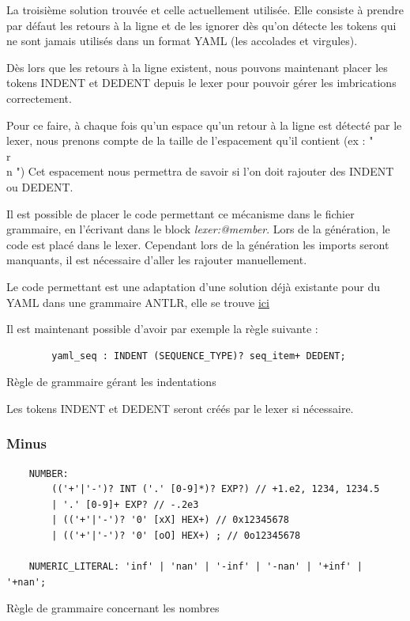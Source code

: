 \documentclass[
    iict, %
    il, %
]{heig-tb}
\begin{document}
La troisième solution trouvée et celle actuellement utilisée. Elle consiste à prendre par défaut les retours à la ligne et de les ignorer dès qu'on détecte les tokens
qui ne sont jamais utilisés dans un format YAML (les accolades et virgules).

Dès lors que les retours à la ligne existent, nous pouvons maintenant placer les tokens INDENT et DEDENT depuis le lexer
pour pouvoir gérer les imbrications correctement.

Pour ce faire, à chaque fois qu'un espace qu'un retour à la ligne est détecté par le lexer, nous prenons compte de la taille de l'espacement qu'il contient (ex : "\\r\\n    ")
Cet espacement nous permettra de savoir si l'on doit rajouter des INDENT ou DEDENT.

Il est possible de placer le code permettant ce mécanisme dans le fichier grammaire, en l'écrivant dans le block \emph{lexer:@member{}}.
Lors de la génération, le code est placé dans le lexer. Cependant lors de la génération les imports seront manquants, il est nécessaire d'aller les rajouter manuellement.

Le code permettant est une adaptation d'une solution déjà existante pour du YAML dans une grammaire ANTLR, elle se trouve \href{https://github.com/umaranis/FastYaml}{ici}

Il est maintenant possible d'avoir par exemple la règle suivante :

\begin{listing}[!ht]
    \begin{verbatim}
        yaml_seq : INDENT (SEQUENCE_TYPE)? seq_item+ DEDENT;
    \end{verbatim}
    \caption{Règle de grammaire gérant les indentations}
    \label{ex-indentation-rule}
\end{listing}

Les tokens INDENT et DEDENT seront créés par le lexer si nécessaire.

\subsubsection{Minus}

\begin{listing}[!ht]
    \begin{verbatim}
    NUMBER:
        (('+'|'-')? INT ('.' [0-9]*)? EXP?) // +1.e2, 1234, 1234.5
        | '.' [0-9]+ EXP? // -.2e3
        | (('+'|'-')? '0' [xX] HEX+) // 0x12345678
        | (('+'|'-')? '0' [oO] HEX+) ; // 0o12345678

    NUMERIC_LITERAL: 'inf' | 'nan' | '-inf' | '-nan' | '+inf' | '+nan';
    \end{verbatim}
    \caption{Règle de grammaire concernant les nombres}
    \label{number-rule}
\end{listing}
\end{document}
